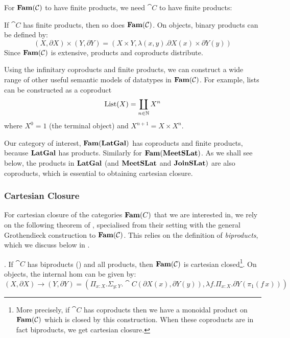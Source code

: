 For $\mathbf{Fam}(\mathcal{C})$ to have finite products, we need $\cat{C}$ to have
finite products:

\begin{proposition}
  If $\cat{C}$ has finite products, then so does $\mathbf{Fam}(\mathcal{C})$. On
  objects, binary products can be defined by:
  \begin{displaymath}
    (X, \partial X) \times (Y, \partial Y) = (X \times Y, \lambda (x, y). \partial X(x) \times \partial Y(y))
  \end{displaymath}
  Since $\mathbf{Fam}(\mathcal{C})$ is extensive, products and coproducts
  distribute.
\end{proposition}

Using the infinitary coproducts and finite products, we can construct
a wide range of other useful semantic models of datatypes in
$\mathbf{Fam}(\mathcal{C})$. For example, lists can be constructed as a coproduct
\begin{equation}
  \label{eqn:lists}
  \mathrm{List}(X) = \coprod_{n \in \mathbb{N}} X^n
\end{equation}
where $X^0 = 1$ (the terminal object) and $X^{n+1} = X \times X^n$.

Our category of interest, $\mathbf{Fam}(\mathbf{LatGal})$ has coproducts and finite
products, because $\mathbf{LatGal}$ has products. Similarly for
$\mathbf{Fam}(\mathbf{MeetSLat})$. As we shall see below, the products in $\mathbf{LatGal}$
(and $\mathbf{MeetSLat}$ and $\mathbf{JoinSLat})$ are also coproducts, which is
essential to obtaining cartesian closure.

\subsubsection{Cartesian Closure}

For cartesian closure of the categories $\mathbf{Fam}(C)$ that we are
interested in, we rely on the following theorem of \citet{nunes2023},
specialised from their setting with the general Grothendieck
construction to $\mathbf{Fam}(\mathcal{C})$. This relies on the definition of
\emph{biproducts}, which we discuss below in .

\begin{theorem}
  \label{thm:fam-closed}
  \AGDA.  If $\cat{C}$ has biproducts () and all
  products, then $\mathbf{Fam}(\mathcal{C})$ is cartesian closed\footnote{More
    precisely, if $\cat{C}$ has coproducts then we have a monoidal
    product on $\mathbf{Fam}(\mathcal{C})$ which is closed by this
    construction. When these coproducts are in fact biproducts, we get
    cartesian closure.}. On objects, the internal hom can be given by:
  \begin{displaymath}
    (X, \partial X) \to (Y, \partial Y) = (\Pi_{x : X}. \Sigma_{y : Y}. \cat{C}(\partial X(x), \partial Y(y)), \lambda f. \Pi_{x : X}. \partial Y(\pi_1(f\, x)))
  \end{displaymath}
\end{theorem}

